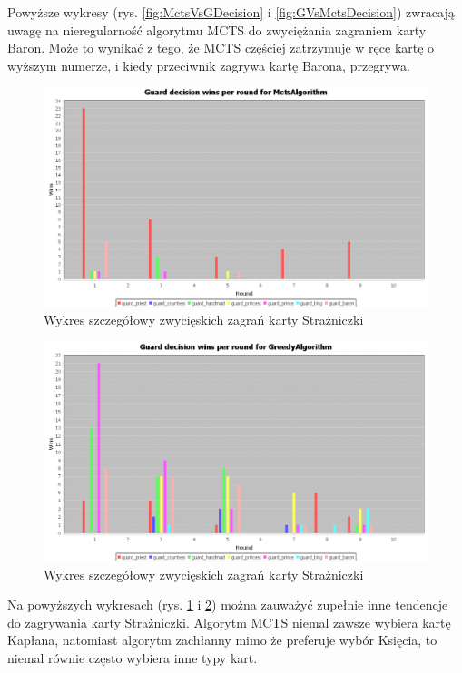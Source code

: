 Powyższe wykresy (rys. \ref{fig:MctsVsGDecision} i \ref{fig:GVsMctsDecision}) zwracają uwagę na nieregularność algorytmu MCTS do zwyciężania zagraniem karty Baron. Może to wynikać z tego, że MCTS częściej zatrzymuje w ręce kartę o wyższym numerze, i kiedy przeciwnik zagrywa kartę Barona, przegrywa.

\begin{figure}[H]
	\centering
	\includegraphics[width=\textwidth]{Resources/MirrorMctsVg/MctsVsGGuardDecision.PNG}
	\caption{Wykres szczegółowy zwycięskich zagrań karty Strażniczki} 
	\label{fig:MctsVsGGuardDecision}
\end{figure}

\begin{figure}[H]
	\centering
	\includegraphics[width=\textwidth]{Resources/MirrorMctsVg/GVsMctsGuardDecision.PNG}
	\caption{Wykres szczegółowy zwycięskich zagrań karty Strażniczki} 
	\label{fig:GVsMctsGuardDecision}
\end{figure}

Na powyższych wykresach (rys. \ref{fig:MctsVsGGuardDecision} i \ref{fig:GVsMctsGuardDecision}) można zauważyć zupełnie inne tendencje do zagrywania karty Strażniczki. Algorytm MCTS niemal zawsze wybiera kartę Kapłana, natomiast algorytm zachłanny mimo że preferuje wybór Księcia, to niemal równie często wybiera inne typy kart.

